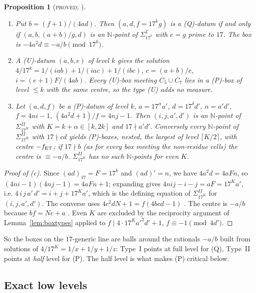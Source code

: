 \documentclass[11pt,reqno]{amsart}
\newtheorem{proposition}[theorem]{Proposition}
\theoremstyle{definition}
\newcommand{\N}{\mathbb N}
\newcommand{\status}[1]{\textup{\textsc{#1}}}
\begin{document}
\begin{proposition}[\status{proved}; {\cite[Lemmas~2.1--2.3, 5.1, 5.2]{PM17}}]\label{prop:boxES}
\begin{enumerate}
\item[(a)] Put $b=(f+1)/(4ad)$.  Then $(a,d,f=17^kg)$ is a (Q)-datum if
and only if $(a,b,(a+b)/g,d)$ is an $\N$-point of $\Sigma^I_{17^k}$ with
$e=g$ prime to $17$.  The box is $-4a^2d\equiv-a/b\pmod{17^k}$.
\item[(b)] A (U)-datum $(a,b,e)$ of level $k$ gives the solution
$4/17^k=1/(iab)+1/(iac)+1/(ibc)$, $c=(a+b)/e$, $i=(e+1)F/(4ab)$.
Every (U)-box meeting $C_5\cup C_7$ lies in a (P)-box of level $\le k$
with the same centre, so the type (U) adds no measure.
\item[(c)] Let $(a,d,f)$ be a (P)-datum of level $k$, $a=17^\alpha a'$,
$d=17^\delta d'$, $n=a'd'$, $f=4ni-1$, $(4a^2d+1)/f=4nj-1$.  Then
$(i,j,a',d')$ is an $\N$-point of $\Sigma^{II}_{17^K}$ with
$K=k+\alpha\in[k,2k]$ and $17\nmid a'd'$.  Conversely every $\N$-point of
$\Sigma^{II}_{17^K}$ with $17\nmid cd$ yields (P)-boxes, nested, the
largest of level $\lceil K/2\rceil$, with centre $-f_{\rm ET}$; if
$17\nmid b$ (as for every box meeting the non-residue cells) the centre is
$\equiv-a/b$.
$\Sigma^{II}_{17^K}$ has no such $\N$-points for even $K$.
\end{enumerate}
\end{proposition}

\begin{proof}[Proof of (c)]
Since $(ad)_{17}=F=17^k$ and $(ad)'=n$, we have $4a^2d=4aFn$, so
$(4ni-1)(4nj-1)=4aFn+1$; expanding gives $4nij-i-j=aF=17^Ka'$, i.e.
$4\,i\,j\,a'\,d'=i+j+17^Ka'$, which is the defining equation of
$\Sigma^{II}_{17^K}$ for $(i,j,a',d')$.  The converse uses
$4c^2dN+1=f(4bcd-1)$ \cite[(2.21)]{ET}.  The centre is $-a/b$ because
$bf=Nc+a$ \cite[(2.20)]{ET}.  Even $K$ are excluded by the reciprocity
argument of Lemma~\ref{lem:boxtypes} applied to $f\mid
4\cdot17^Ka'^2d'+1$, $f\equiv-1\pmod{4d'}$.
\end{proof}

So the boxes on the $17$-generic line are balls around the rationals
$-a/b$ built from solutions of $4/17^K=1/x+1/y+1/z$: Type~I points at
full level for (Q), Type~II points at \emph{half} level for (P).  The
half level is what makes (P) critical below.

\subsection{Exact low levels}
\end{document}
